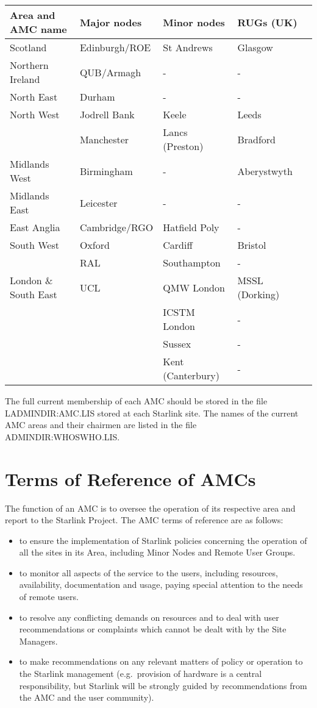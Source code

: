\begin{table}[h]
\begin{center}
\begin{tabular}{|l|l|l|l|l|} \hline
{\bf Area and AMC name} & {\bf Major nodes} & {\bf Minor nodes} &
{\bf RUGs (UK)} \\
\hline
\hline
Scotland & Edinburgh/ROE & St Andrews & Glasgow \\
\hline
Northern Ireland & QUB/Armagh & - & - \\
\hline
North East & Durham & - & - \\
\hline
North West & Jodrell Bank & Keele & Leeds \\
& Manchester & Lancs (Preston) & Bradford \\
\hline
Midlands West & Birmingham & - & Aberystwyth \\
\hline
Midlands East & Leicester & - & - \\
\hline
East Anglia & Cambridge/RGO & Hatfield Poly & - \\
\hline
South West & Oxford & Cardiff & Bristol \\
& RAL & Southampton & - \\
\hline
London \& South East & UCL & QMW London & MSSL (Dorking) \\
& & ICSTM London & - \\
& & Sussex & - \\
& & Kent (Canterbury) & - \\
\hline
\end{tabular}
\end{center}
\end{table}
The full current membership of each AMC should be stored in the file
LADMINDIR:AMC.LIS stored at each Starlink site.
The names of the current AMC areas and their chairmen are listed in the
file ADMINDIR:WHOSWHO.LIS.

\section{Terms of Reference of AMCs}

The function of an AMC is to oversee the operation of its respective area
and report to the Starlink Project.
The AMC terms of reference are as follows:
\begin{itemize}
\item to ensure the implementation of Starlink policies concerning the operation
of all the sites in its Area, including Minor Nodes and Remote User Groups.
\item to monitor all aspects of the service to the users, including resources,
availability, documentation and usage, paying special attention to the needs of
remote users.
\item to resolve any conflicting demands on resources and to deal with user
recommendations or complaints which cannot be dealt with by the Site Managers.
\item to make recommendations on any relevant matters of policy or operation to
the Starlink management (e.g.\ provision of hardware is a central
responsibility, but Starlink will be strongly guided by recommendations from
the AMC and the user community).
\end{itemize}


